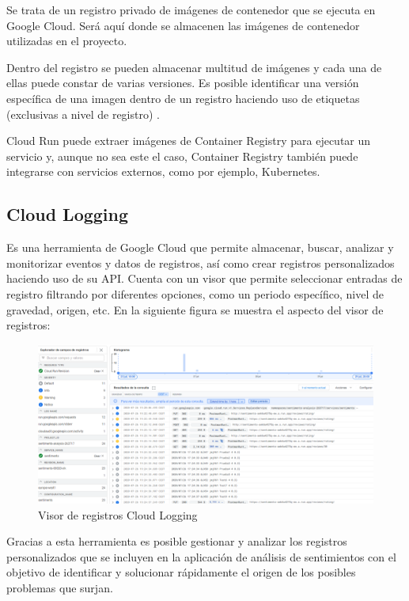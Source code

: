 Se trata de un registro privado de imágenes de contenedor que se ejecuta en Google Cloud. Será aquí donde se almacenen las imágenes de contenedor utilizadas en el proyecto. 

Dentro del registro se pueden almacenar multitud de imágenes y cada una de ellas puede constar de varias versiones. Es posible identificar una versión específica de una imagen dentro de un registro haciendo uso de etiquetas (exclusivas a nivel de registro) . 

Cloud Run puede extraer imágenes de Container Registry para ejecutar un servicio y, aunque no sea este el caso, Container Registry también puede integrarse con servicios externos, como por ejemplo, Kubernetes.

\subsection{Cloud Logging}

Es una herramienta de Google Cloud que permite almacenar, buscar, analizar y monitorizar eventos y datos de registros, así como crear registros personalizados haciendo uso de su API. Cuenta con un visor que permite seleccionar entradas de registro filtrando por diferentes opciones, como un periodo específico, nivel de gravedad, origen, etc. En la siguiente figura se muestra el aspecto del visor de registros:

\begin{figure}[ht]
	\begin{center}
		\includegraphics[width = 1\textwidth]{Figuras/cloudLogging.PNG}
	\end{center}
	\caption{\label{fig:cloudLogging} Visor de registros Cloud Logging}
\end{figure}

\newpage

Gracias a esta herramienta es posible gestionar y analizar los registros personalizados que se incluyen en la aplicación de análisis de sentimientos con el objetivo de identificar y solucionar rápidamente el origen de los posibles problemas que surjan.

